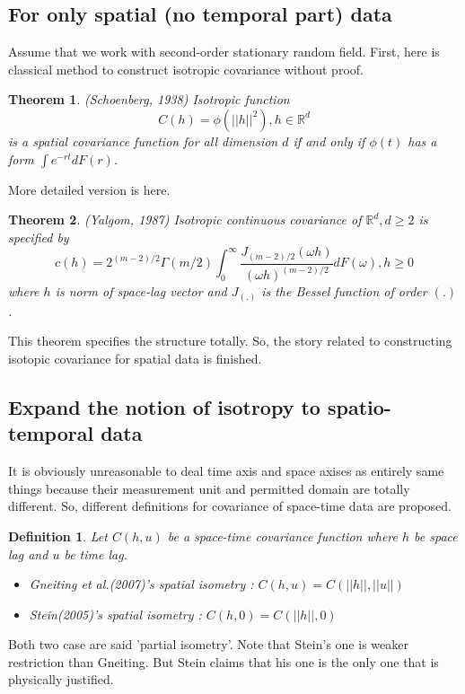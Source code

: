 \documentclass{article}
\newtheorem*{theorem}{Theorem}
\newtheorem*{definition}{Definition}
\begin{document}
\subsection{For only spatial (no temporal part) data}
Assume that we work with second-order stationary random field.
First, here is classical method to construct isotropic covariance without proof.
\begin{theorem}{(Schoenberg, 1938)}
    Isotropic function
    \[C(h)=\phi(||h||^2),h\in\mathbb R^d\]
    is a spatial covariance function for all dimension $d$ if and only if $\phi(t)$ has a form $\int e^{-rt}dF(r)$.
\end{theorem}
More detailed version is here.
\begin{theorem}{(Yalgom, 1987)}
    Isotropic continuous covariance of $\mathbb R^d, d\geq 2$ is specified by
    \[c(h)=2^{(m-2)/2} \Gamma(m/2) \int_0^\infty \frac{J_{(m-2)/2}(\omega h)}{(\omega h)^{(m-2)/2}}dF(\omega), h\geq 0\]
    where $h$ is norm of space-lag vector and $J_(.)$ is the Bessel function of order $(.)$.
\end{theorem}
This theorem specifies the structure totally. So, the story related to constructing isotopic covariance for spatial data is finished.



\subsection{Expand the notion of isotropy to spatio-temporal data}
It is obviously unreasonable to deal time axis and space axises as entirely same things because their measurement unit and permitted domain are totally different.
So, different definitions for covariance of space-time data are proposed. 

\begin{definition}
    Let $C(h,u)$ be a space-time covariance function where $h$ be space lag and $u$ be time lag.
    \begin{itemize}
        \item Gneiting et al.(2007)'s spatial isometry : $C(h,u)=C(||h||,||u||)$
        \item Stein(2005)'s spatial isometry : $C(h,0)=C(||h||,0)$
    \end{itemize}    
\end{definition}
Both two case are said 'partial isometry'.
Note that Stein's one is weaker restriction than Gneiting. But Stein claims that his one is the only one that is physically justified.
\end{document}
